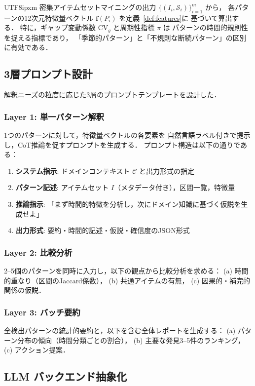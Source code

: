 \documentclass[conference]{IEEEtran}
\begin{document}
\begin{CJK}{UTF8}{ipxm}
密集アイテムセットマイニングの出力 $\{(I_i, \mathcal{S}_i)\}_{i=1}^{m}$ から，
各パターンの12次元特徴量ベクトル $\mathbf{f}(P_i)$ を定義~\ref{def:features}に
基づいて算出する．
特に，ギャップ変動係数 $\text{CV}_g$ と周期性指標 $\pi$ は
パターンの時間的規則性を捉える指標であり，
「季節的パターン」と「不規則な断続パターン」の区別に有効である．

\subsection{3層プロンプト設計}

解釈ニーズの粒度に応じた3層のプロンプトテンプレートを設計した．

\subsubsection{Layer 1: 単一パターン解釈}
1つのパターンに対して，特徴量ベクトルの各要素を
自然言語ラベル付きで提示し，CoT推論を促すプロンプトを生成する．
プロンプト構造は以下の通りである：

\begin{enumerate}[nosep]
    \item \textbf{システム指示}: ドメインコンテキスト $\mathcal{C}$ と出力形式の指定
    \item \textbf{パターン記述}: アイテムセット $I$（メタデータ付き），区間一覧，特徴量
    \item \textbf{推論指示}: 「まず時間的特徴を分析し，次にドメイン知識に基づく仮説を生成せよ」
    \item \textbf{出力形式}: 要約・時間的記述・仮説・確信度のJSON形式
\end{enumerate}

\subsubsection{Layer 2: 比較分析}
2--5個のパターンを同時に入力し，以下の観点から比較分析を求める：
(a) 時間的重なり（区間のJaccard係数），
(b) 共通アイテムの有無，
(c) 因果的・補完的関係の仮説．

\subsubsection{Layer 3: バッチ要約}
全検出パターンの統計的要約と，以下を含む全体レポートを生成する：
(a) パターン分布の傾向（時間分類ごとの割合），
(b) 主要な発見3--5件のランキング，
(c) アクション提案．

\subsection{LLM バックエンド抽象化}


\end{CJK}
\end{document}
